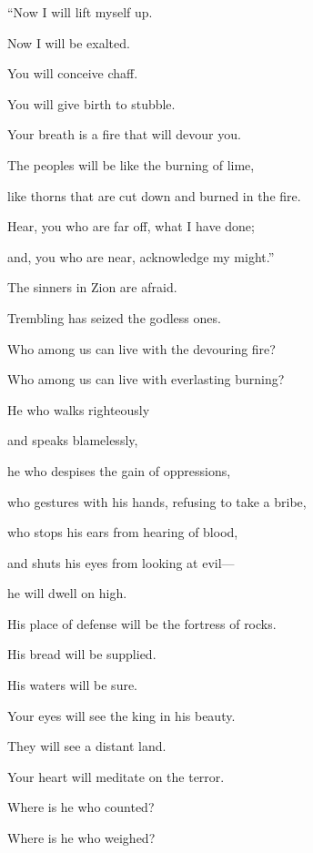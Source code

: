 {\par }{\QB “Now I will lift myself up.
\par }{\QB Now I will be exalted.
\par }{\Q {}You will conceive chaff.
\par }{\QB You will give birth to stubble.
\par }{\QB Your breath is a fire that will devour you.
\par }{\Q {}The peoples will be like the burning of lime,
\par }{\QB like thorns that are cut down and burned in the fire.
\par }{\BB \par }{\Q {}Hear, you who are far off, what I have done;
\par }{\QB and, you who are near, acknowledge my might.”
\par }{\Q {}The sinners in Zion are afraid.
\par }{\QB Trembling has seized the godless ones.
\par }{\Q Who among us can live with the devouring fire?
\par }{\QB Who among us can live with everlasting burning?
\par }{\Q {}He who walks righteously
\par }{\QB and speaks blamelessly,
\par }{\QB he who despises the gain of oppressions,
\par }{\QB who gestures with his hands, refusing to take a bribe,
\par }{\QB who stops his ears from hearing of blood,
\par }{\QB and shuts his eyes from looking at evil—
\par }{\Q {}he will dwell on high.
\par }{\QB His place of defense will be the fortress of rocks.
\par }{\QB His bread will be supplied.
\par }{\QB His waters will be sure.
\par }{\BB \par }{\Q {}Your eyes will see the king in his beauty.
\par }{\QB They will see a distant land.
\par }{\Q {}Your heart will meditate on the terror.
\par }{\QB Where is he who counted?
\par }{\QB Where is he who weighed?
}
